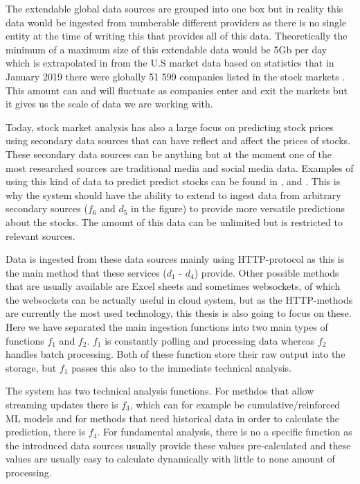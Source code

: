 The extendable global data sources are grouped into one box but in reality this data would be ingested from numberable different providers as there is no single entity at the time of writing this that provides all of this data.
Theoretically the minimum of a maximum size of this extendable data would be 5Gb per day which is extrapolated in from the U.S market data based on statistics that in January 2019 there were globally 51 599 companies listed in the stock markets \cite{global}.
This amount can and will fluctuate as companies enter and exit the markets but it gives us the scale of data we are working with.

Today, stock market analysis has also a large focus on predicting stock prices using secondary data sources that can have reflect and affect the prices of stocks. 
These secondary data sources can be anything but at the moment one of the most researched sources are traditional media and social media data.
Examples of using this kind of data to predict predict stocks can be found in \cite{kao}, \cite{skuza} and \cite{wai}.
This is why the system should have the ability to extend to ingest data from arbitrary secondary sources ($f_6$ and $d_5$ in the figure) to provide more versatile predictions about the stocks.
The amount of this data can be unlimited but is restricted to relevant sources.

Data is ingested from these data sources mainly using HTTP-protocol as this is the main method that these services ($d_1$ - $d_4$) provide.
Other possible methods that are usually available are Excel sheets and sometimes websockets, of which the websockets can be actually useful in cloud system, but as the HTTP-methods are currently the most used technology, this thesis is also going to focus on these.
Here we have separated the main ingestion functions into two main types of functions $f_1$ and $f_2$. 
$f_1$ is constantly polling and processing data whereas $f_2$ handles batch processing.
Both of these function store their raw output into the storage, but $f_1$ passes this also to the immediate technical analysis.

The system has two technical analysis functions.
For methdos that allow streaming updates there is $f_3$, which can for example be cumulative/reinforced ML models and for methods that need historical data in order to calculate the prediction, there is $f_4$.
For fundamental analysis, there is no a specific function as the introduced data sources usually provide these values pre-calculated and these values are usually easy to calculate dynamically with little to none amount of processing.

